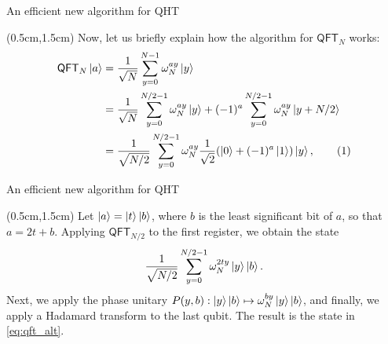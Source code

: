 \documentclass{beamer}
\theoremstyle{definition}
\newcommand\numberthis{\addtocounter{equation}{1}\tag{\theequation}}
\newcommand{\qft}{\mathsf{QFT}}
\begin{document}
\begin{frame}{An efficient new algorithm for QHT}
    
    \begin{textblock*}{12cm}(0.5cm,1.5cm)
        Now, let us briefly explain how the algorithm for $\qft_N$ works:
        \begin{align*}
            \qft_N\ket{a}
            & = \frac{1}{\sqrt{N}} \sum_{y = 0}^{N - 1} \omega_N^{ay}\ket{y} \\
            & = \frac{1}{\sqrt{N}} \sum_{y = 0}^{N / 2 - 1} \omega_N^{ay} \ket{y} + (-1)^a \sum_{y = 0}^{N / 2 - 1} \omega_N^{ay} \ket{y + N/2} \\
            & = \frac{1}{\sqrt{N / 2}} \sum_{y = 0}^{N / 2 - 1} \omega_N^{ay} \frac{1}{\sqrt{2}} (\ket{0} + (-1)^a \ket{1}) \ket{y}, \numberthis\label{eq:qft_alt}
        \end{align*}
       
    \end{textblock*}
    

\end{frame}


\begin{frame}{An efficient new algorithm for QHT}
    
    \begin{textblock*}{12cm}(0.5cm,1.5cm)
        Let $\ket{a} = \ket{t}\ket{b}$, where $b$ is the least significant bit of $a$, so that $a = 2t + b$. Applying $\qft_{N / 2}$ to the first register, we obtain the state
        \[ \frac{1}{\sqrt{N / 2}} \sum_{y = 0}^{N / 2 - 1} \omega_N^{2ty} \ket{y} \ket{b}. \]
        Next, we apply the phase unitary $P(y, b): \ket{y} \ket{b} \mapsto \omega_N^{by} \ket{y} \ket{b}$, and finally, we apply a Hadamard transform to the last qubit. The result is the state in \eqref{eq:qft_alt}.  

    \end{textblock*}
    

\end{frame}
\end{document}
